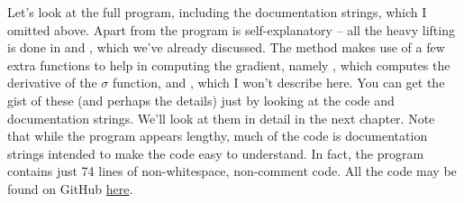 \documentclass[a4paper,twoside,10pt]{book}
\begin{document}
Let's look at the full program, including the documentation strings, which I omitted above. Apart from  the program is self-explanatory -- all the heavy lifting is done in  and , which we've already discussed. The  method makes use of a few extra functions to help in computing the gradient, namely , which computes the derivative of the $\sigma$ function, and  , which I won't describe here. You can get the gist of these (and perhaps the details) just by looking at the code and documentation strings. We'll look at them in detail in the next chapter. Note that while the program appears lengthy, much of the code is documentation strings intended to make the code easy to understand. In fact, the program contains just 74 lines of non-whitespace, non-comment code. All the code may be found on GitHub \href{https://github.com/mnielsen/neural-networks-and-deep-learning/blob/master/src/network.py}{here}.
\end{document}
